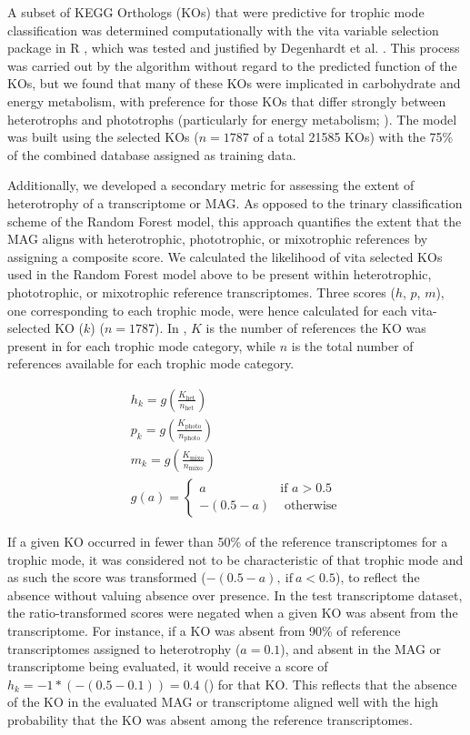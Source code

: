 \documentclass[12pt]{article}
\numberwithin{equation}{section}
\begin{document}
A subset of KEGG Orthologs (KOs) that were predictive for trophic mode classification was determined computationally with the vita variable selection package in R \citep{Janitza_2016}, which was tested and justified by Degenhardt et al. \citet{Degenhardt_2017}. This process was carried out by the algorithm without regard to the predicted function of the KOs, but we found that many of these KOs were implicated in carbohydrate and energy metabolism, with preference for those KOs that differ strongly between heterotrophs and phototrophs (particularly for energy metabolism; ). The model was built using the selected KOs ($n=1787$ of a total 21585 KOs) with the 75\% of the combined database assigned as training data.

Additionally, we developed a secondary metric for assessing the extent of heterotrophy of a transcriptome or MAG. As opposed to the trinary classification scheme of the Random Forest model, this approach quantifies the extent that the MAG aligns with heterotrophic, phototrophic, or mixotrophic references by assigning a composite score. We calculated the likelihood of vita selected KOs used in the Random Forest model above to be present within heterotrophic, phototrophic, or mixotrophic reference transcriptomes. Three scores ($h$, $p$, $m$), one corresponding to each trophic mode, were hence calculated for each vita-selected  KO ($k$) ($n=1787$). In  , $K$ is the number of references the KO was present in for each trophic mode category, while $n$ is the total number of references available for each trophic mode category.

\begin{gather}\label{eq:hks}
    h_k = g\left(\frac{K_\textrm{het}}{n_\textrm{het}}\right)\\
    p_k = g\left(\frac{K_\textrm{photo}}{n_\textrm{photo}}\right)\\
    m_k = g\left(\frac{K_\textrm{mixo}}{n_\textrm{mixo}}\right)\\
    g(a) = \begin{cases}
       a & \textrm{if } a > 0.5 \\
       -(0.5-a) & \textrm{ otherwise} \label{eq:connectfinal}
    \end{cases} 
\end{gather}

If a given KO occurred in fewer than 50\% of the reference transcriptomes for a trophic mode, it was considered not to be characteristic of that trophic mode and as such the score was transformed ($-(0.5 - a),\ \text{if} \ a<0.5$), to reflect the absence without valuing absence over presence. In the test transcriptome dataset, the ratio-transformed scores were negated when a given KO was absent from the transcriptome. For instance, if a KO was absent from 90\% of reference transcriptomes assigned to heterotrophy ($a = 0.1$), and absent in the MAG or transcriptome being evaluated, it would receive a score of $h_k = -1 * (-(0.5-0.1)) = 0.4$ () for that KO. This reflects that the absence of the KO in the evaluated MAG or transcriptome aligned well with the high probability that the KO was absent among the reference transcriptomes.
\end{document}
